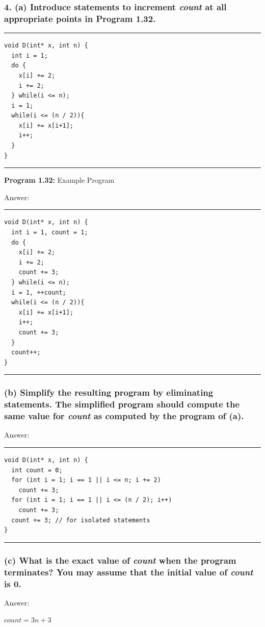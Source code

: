 \documentclass[a4paper]{article}
\begin{document}
\subsubsection*{4. (a) Introduce statements to increment \textit{count} at all appropriate points in Program 1.32.}
\hrule
\begin{lstlisting}
void D(int* x, int n) {
  int i = 1;
  do {
    x[i] += 2;
    i += 2;
  } while(i <= n);
  i = 1;
  while(i <= (n / 2)){
    x[i] += x[i+1];
    i++;
  }
}
\end{lstlisting}
\hrule
\begin{spacing}{1.3}
\noindent \textbf{Program 1.32:} Example Program \par
\noindent Answer:\end{spacing}
\hrule
\begin{lstlisting}
void D(int* x, int n) {
  int i = 1, count = 1;
  do {
    x[i] += 2;
    i += 2;
    count += 3;
  } while(i <= n);
  i = 1, ++count;
  while(i <= (n / 2)){
    x[i] += x[i+1];
    i++;
    count += 3;
  }
  count++;
}
\end{lstlisting}
\hrule

\subsubsection*{(b) Simplify the resulting program by eliminating statements. The simplified program should compute the same value for \textit{count} as computed by the program of (a).}
\begin{spacing}{1.3}
Answer:\end{spacing}
\hrule
\begin{lstlisting}
void D(int* x, int n) {
  int count = 0;
  for (int i = 1; i == 1 || i <= n; i += 2)
    count += 3;
  for (int i = 1; i == 1 || i <= (n / 2); i++)
    count += 3;
  count += 3; // for isolated statements
}
\end{lstlisting}
\hrule
\subsubsection*{(c) What is the exact value of \textit{count} when the program terminates? You may assume that the initial value of \textit{count} is 0.}
\begin{spacing}{1.3}
Answer: \par$count = 3n+3$\end{spacing}
\end{document}
